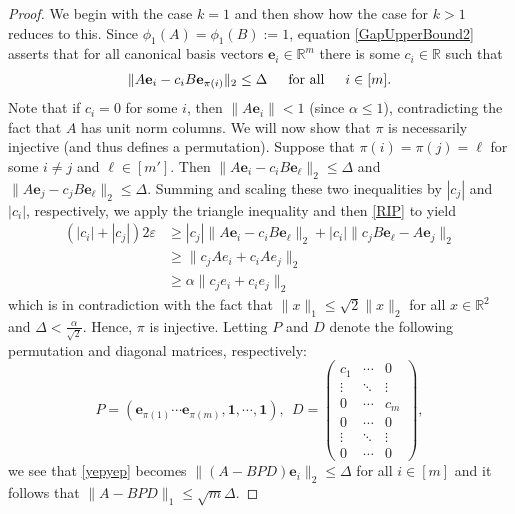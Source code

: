\documentclass[journal, onecolumn]{IEEEtran}
\begin{document}
\begin{proof}
We begin with the case $k=1$ and then show how the case for $k>1$ reduces to this. Since $\phi_1(A) = \phi_1(B) := 1$, equation \eqref{GapUpperBound2} asserts that for all canonical basis vectors $\mathbf{e}_i \in \mathbb{R}^m$ there is some $c_i \in \mathbb{R}$ such that 
\begin{align}\label{yepyep}
\|A\mathbf{e}_i - c_iB\mathbf{e}_{\pi(i)}\|_2 \leq \Delta \indent \text{for all} \indent i \in [m].
\end{align}
Note that if $c_i = 0$ for some $i$, then $\|A\mathbf{e}_i\| < 1$ (since $\alpha \leq 1$), contradicting the fact that $A$ has unit norm columns. We will now show that $\pi$ is necessarily injective (and thus defines a permutation). Suppose that $\pi(i) = \pi(j) = \ell$ for some $i \neq j$ and $\ell \in [m']$. Then $\|A\mathbf{e}_i - c_iB\mathbf{e}_{\ell}\|_2  \leq \Delta$ and $\|A\mathbf{e}_j - c_jB\mathbf{e}_{\ell}\|_2 \leq \Delta$. Summing and scaling these two inequalities by $|c_j|$ and $|c_i|$, respectively, we apply the triangle inequality and then \eqref{RIP} to yield
\begin{align*}
(|c_i| + |c_j|) 2\varepsilon
&\geq |c_j|\|A\mathbf{e}_i - c_iB\mathbf{e}_{\ell}\|_2 + |c_i|\|c_jB\mathbf{e}_{\ell} - A\mathbf{e}_j\|_2 \\
&\geq \|c_jAe_i + c_iAe_j\|_2 \\
&\geq \alpha\|c_je_i + c_ie_j\|_2
\end{align*}
%
which is in contradiction with the fact that $\|x\|_1 \leq \sqrt{2}\|x\|_2$ for all $x \in \mathbb{R}^2$ and $\Delta < \frac{\alpha}{\sqrt{2}}$. Hence, $\pi$ is injective. Letting $P$ and $D$ denote the following permutation and diagonal matrices, respectively:
\begin{equation}\label{PandD}
P = \left( \mathbf{e}_{\pi(1)} \cdots \mathbf{e}_{\pi(m)}, \mathbf{1}, \cdots, \mathbf{1} \right), \ \ D = \left(\begin{array}{ccc}c_1 & \cdots & 0 \\\vdots & \ddots & \vdots \\0 & \cdots & c_m \\ 0 & \cdots & 0 \\ \vdots & \ddots & \vdots \\ 0 & \cdots & 0
\end{array}\right),
\end{equation}
%
we see that \eqref{yepyep} becomes $\|(A - BPD)\mathbf{e}_i\|_2 \leq \Delta$ for all $i \in [m]$ and it follows that $\|A-BPD\|_1 \leq \sqrt{m}\Delta$.


\end{proof}
\end{document}
